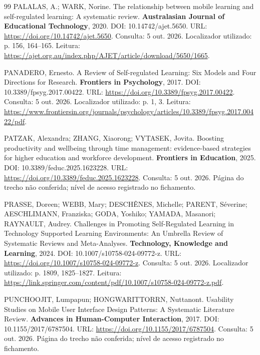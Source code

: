 \begin{thebibliography}{99}
 PALALAS, A.; WARK, Norine. The relationship between mobile learning and self-regulated learning: A systematic review. \textbf{Australasian Journal of Educational Technology}, 2020. DOI: 10.14742/ajet.5650. URL: \url{https://doi.org/10.14742/ajet.5650}. Consulta: 5 out. 2026. Localizador utilizado: p. 156, 164–165. Leitura: \url{https://ajet.org.au/index.php/AJET/article/download/5650/1665}.


 PANADERO, Ernesto. A Review of Self-regulated Learning: Six Models and Four Directions for Research. \textbf{Frontiers in Psychology}, 2017. DOI: 10.3389/fpsyg.2017.00422. URL: \url{https://doi.org/10.3389/fpsyg.2017.00422}. Consulta: 5 out. 2026. Localizador utilizado: p. 1, 3. Leitura: \url{https://www.frontiersin.org/journals/psychology/articles/10.3389/fpsyg.2017.00422/pdf}.


 PATZAK, Alexandra; ZHANG, Xiaorong; VYTASEK, Jovita. Boosting productivity and wellbeing through time management: evidence-based strategies for higher education and workforce development. \textbf{Frontiers in Education}, 2025. DOI: 10.3389/feduc.2025.1623228. URL: \url{https://doi.org/10.3389/feduc.2025.1623228}. Consulta: 5 out. 2026. Página do trecho não conferida; nível de acesso registrado no fichamento.


 PRASSE, Doreen; WEBB, Mary; DESCHÊNES, Michelle; PARENT, Séverine; AESCHLIMANN, Franziska; GODA, Yoshiko; YAMADA, Masanori; RAYNAULT, Audrey. Challenges in Promoting Self-Regulated Learning in Technology Supported Learning Environments: An Umbrella Review of Systematic Reviews and Meta-Analyses. \textbf{Technology, Knowledge and Learning}, 2024. DOI: 10.1007/s10758-024-09772-z. URL: \url{https://doi.org/10.1007/s10758-024-09772-z}. Consulta: 5 out. 2026. Localizador utilizado: p. 1809, 1825–1827. Leitura: \url{https://link.springer.com/content/pdf/10.1007/s10758-024-09772-z.pdf}.


 PUNCHOOJIT, Lumpapun; HONGWARITTORRN, Nuttanont. Usability Studies on Mobile User Interface Design Patterns: A Systematic Literature Review. \textbf{Advances in Human-Computer Interaction}, 2017. DOI: 10.1155/2017/6787504. URL: \url{https://doi.org/10.1155/2017/6787504}. Consulta: 5 out. 2026. Página do trecho não conferida; nível de acesso registrado no fichamento.



\end{thebibliography}
